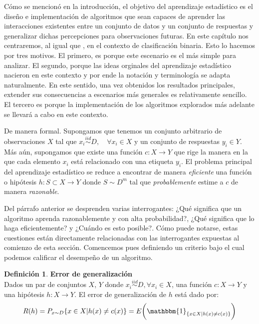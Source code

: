 \documentclass{book}
\theoremstyle{plain}
\theoremstyle{definition}
\newtheorem{defn}{Definición}[section]
\theoremstyle{remark}
\begin{document}
Cómo se mencionó en la introducción, el objetivo del aprendizaje estadístico es el diseño e implementación de algoritmos que sean capaces de aprender las interacciones existentes entre un conjunto de datos y un conjunto de respuestas y generalizar dichas percepciones para observaciones futuras. En este capítulo nos centraremos, al igual que \cite{VAPNIK1}, en el contexto de clasificación binaria. Esto lo hacemos por tres motivos. El primero, es porque este escenario es el más simple para analizar. El segundo, porque las ideas orginales del aprendizaje estadístico nacieron en este contexto y por ende la notación y terminología se adapta naturalmente. En este sentido,  una vez obtenidos los resultados principales, extender sus consecuencias a escenarios más generales es relativamente sencillo. El tercero es porque la implementación de los algoritmos explorados más adelante se llevará a cabo en este contexto. 

De manera formal. Supongamos que tenemos un conjunto arbitrario de observaciones $X$ tal que $x_i \stackrel{iid}{\sim} D,\quad\forall x_i\in X$ y un conjunto de respuestas $y_i\in Y$. Más aún, supongamos que existe una función $c:X\rightarrow Y$ que rige la manera en la que cada elemento $x_i$ está relacionado con una etiqueta $y_i$. El problema principal del aprendizaje estadístico se reduce a encontrar de manera \emph{eficiente} una función o hipótesis $h:S\subset X\rightarrow Y$ donde $S\sim D^m$ tal que \emph{probablemente} estime a $c$ de manera \emph{razonable}.

Del párrafo anterior se desprenden varias interrogantes: ¿Qué significa que un algoritmo aprenda razonablemente y con alta probabilidad?, ¿Qué significa que lo haga eficientemente? y ¿Cuándo es esto posible?. Cómo puede notarse, estas cuestiones están directamente relacionadas con las interrogantes expuestas al comienzo de esta sección. Comencemos pues definiendo un criterio bajo el cual podemos calificar el desempeño de un algoritmo.
\bigskip\bigskip


\begin{defn}\label{eq:def_gen_err}
\textbf{Error de generalización}\\
  Dados un par de conjuntos $X$, $Y$ donde $x_i \stackrel{iid}{\sim} D,\forall x_i\in X$, una función $c:X\rightarrow Y$ y una hipótesis $h:X\rightarrow Y$. El error de generalización de $h$ está dado por:
\begin{equation*}
R(h)=P_{x\sim D}\{x\in X| h(x)\neq c(x)\}=E\bigg(\mathbbm{1}_{\{x\in X| h(x)\neq c(x)\}}\bigg)
\end{equation*}
\end{defn}
\end{document}
